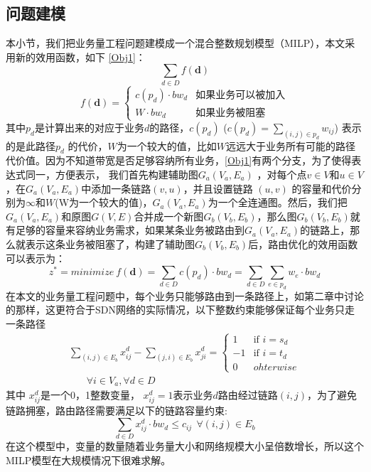 \subsection{问题建模}
本小节，我们把业务量工程问题建模成一个混合整数规划模型（MILP），本文采用新的效用函数，如下 \ref{Obj1}：
\begin{equation}\label{Obj1}
\sum\limits_{d \in D} f(\mathbf{d})
\end{equation}
\begin{equation}\label{obin}
f(\mathbf{d})=\begin{cases}
c(p_d) \cdot bw_{d} & \text{如果业务可以被加入}\\
W \cdot bw_{d}& \text{如果业务被阻塞}
\end{cases}
\end{equation}
其中$p_d$是计算出来的对应于业务$d$的路径，$c(p_d)$ ($c(p_d) = \sum_{(i,j)\in p_d} w_{ij}$) 表示的是此路径$p_d$ 的代价，$W$为一个较大的值，比如$W$远远大于业务所有可能的路径代价值。因为不知道带宽是否足够容纳所有业务，\ref{Obj1}有两个分支，为了使得表达式同一，方便表示，
我们首先构建辅助图$G_a(V_a, E_a)$ ，对每个点$v \in V$和$u \in V$，在$G_a(V_a,E_a)$中添加一条链路$(v,u)$，并且设置链路 $(u,v)$ 的容量和代价分别为$\infty$和$W$(W为一个较大的值)，$G_a(V_a,E_a)$为一个全连通图。然后，我们把$G_a(V_a,E_a)$和原图$G(V,E)$合并成一个新图$G_b(V_b,E_b)$，那么图$G_b(V_b,E_b)$就有足够的容量来容纳业务需求，如果某条业务被路由到$G_a(V_a, E_a)$的链路上，那么就表示这条业务被阻塞了，构建了辅助图$G_b(V_b, E_b)$后，路由优化的效用函数可以表示为：
\begin{equation}\label{Obj2}
z^* = minimize~f(\mathbf{d})=
\sum\limits_{d \in D} c(p_d)\cdot bw_d= \sum\limits_{d \in D}\sum\limits_{e \in p_d} w_e \cdot bw_d
\end{equation}
在本文的业务量工程问题中，每个业务只能够路由到一条路径上，如第二章中讨论的那样，这更符合于SDN网络的实际情况，以下整数约束能够保证每个业务只走一条路径
\begin{equation}\label{FlowConv}
\begin{split}
\sum\limits_{(i,j) \in E_b} x_{ij}^d - \sum\limits_{(j,i) \in E_b} x_{ji}^d
=\begin{cases}
1 & \text{if $i = s_d$}\\
-1 & \text{if $i = t_d$} \\
0 &{ohterwise}
\end{cases}
\\~~~~~~~~\forall i\in V_a, \forall d\in D
\end{split}
\end{equation}
其中 $x_{ij}^d$是一个0，1整数变量， $x_{ij}^d=1$表示业务$d$路由经过链路$(i,j)$，为了避免链路拥塞，路由路径需要满足以下的链路容量约束:
\begin{equation}\label{Capcon}
\sum\limits_{d \in D}x_{ij}^d \cdot bw_d \le c_{ij} ~~\forall (i,j)\in E_b
\end{equation}
在这个模型中，变量的数量随着业务量大小和网络规模大小呈倍数增长，所以这个MILP模型在大规模情况下很难求解。
